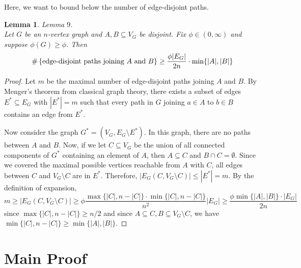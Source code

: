 \documentclass[10pt]{article}
\newtheorem{lemma}[theorem]{Lemma}
\theoremstyle{definition}
\theoremstyle{definition}
\theoremstyle{definition}
\theoremstyle{definition}
\newcommand{\txt}[1]
{\textnormal{#1}}
\begin{document}
Here, we want to bound below the number of edge-disjoint paths.

\begin{lemma} Lemma $9$. \\
Let $G$ be an $n$-vertex graph and $A, B \subseteq V_G$ be disjoint. Fix $\phi \in (0, \infty)$ and suppose $\phi(G) \geq \phi$.
Then
\[
\#\left\{\txt{edge-disjoint paths joining }A \txt{ and } B\right\} \geq \frac{\phi |E_G|}{2n} \cdot \min\{|A|, |B|\}
\]
\end{lemma}
\begin{proof}
Let $m$ be the maximal number of edge-disjoint paths joining $A$ and $B$. 
By Menger's theorem from classical graph theory, there exists a subset of edges $E^* \subseteq E_G$ with $|E^*| = m$ such that every path in $G$ joining $a \in A$ to $b \in B$ contains an edge from $E^*$.

Now consider the graph $G^* = (V_G, E_G \setminus E^*)$. In this graph, there are no paths between $A$ and $B$. Now, if we let $C \subseteq V_G$ be the union of all connected components of $G^*$ containing an element of $A$, then $A \subseteq C$ and $B \cap C = \emptyset$. 
Since we covered the maximal possible vertices reachable from $A$ with $C$, all edges between $C$ and $V_G \setminus C$ are in $E^*$.
Therefore, $|E_G(C, V_G \setminus C)| \leq |E^*| = m$.
By the definition of expansion,
\[
m \geq |E_G(C, V_G\setminus C)| \geq \phi\frac{\max\{|C|, n - |C|\} \cdot \min\{|C|, n - |C|\}}{n^2}|E_G| \geq \frac{\phi \min\{|A|, |B|\}\cdot |E_G|}{2n}
\]
since $\max\{|C|, n - |C|\} \geq n/2$ and since $A \subseteq C, B \subseteq V_G \setminus C$, we have $\min\{|C|, n - |C|\} \geq \min\{|A|, |B|\}$.

\end{proof}


\section{Main Proof}
\end{document}
